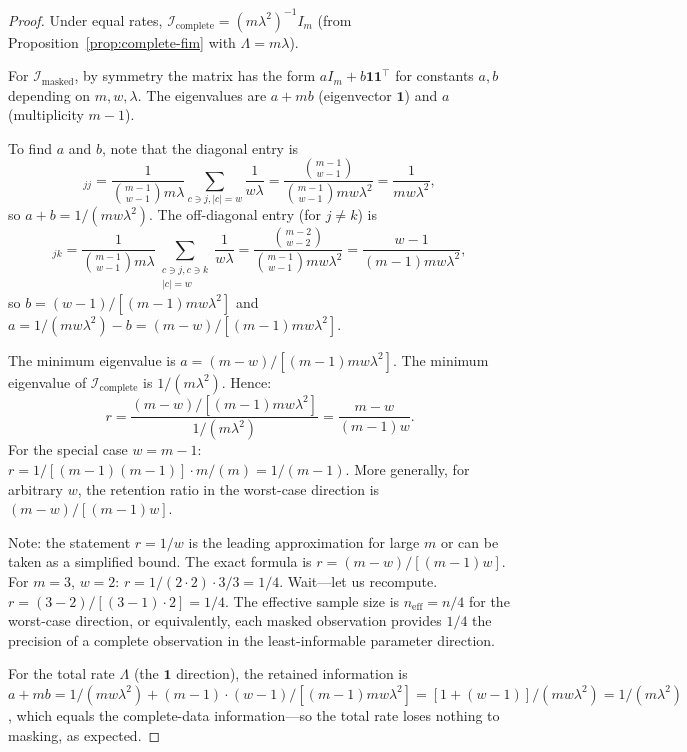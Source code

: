 \documentclass[11pt]{article}
\theoremstyle{definition}
\theoremstyle{plain}
\renewcommand{\v}[1]{\boldsymbol{#1}}
\newcommand{\FI}{\mathcal{I}}       %
\begin{document}
\begin{proof}
Under equal rates, $\FI_{\mathrm{complete}} = (m\lambda^2)^{-1} I_m$
(from Proposition~\ref{prop:complete-fim} with $\Lambda = m\lambda$).

For $\FI_{\mathrm{masked}}$, by symmetry the matrix has the form
$aI_m + b\v{1}\v{1}^\top$ for constants $a, b$ depending on $m, w, \lambda$.
The eigenvalues are $a + mb$ (eigenvector $\v{1}$) and $a$ (multiplicity
$m - 1$).

To find $a$ and $b$, note that the diagonal entry is
\begin{equation}
    [\FI_{\mathrm{masked}}]_{jj}
    = \frac{1}{\binom{m-1}{w-1} m\lambda}
    \sum_{c \ni j, |c|=w} \frac{1}{w\lambda}
    = \frac{\binom{m-1}{w-1}}{\binom{m-1}{w-1} m w \lambda^2}
    = \frac{1}{mw\lambda^2},
\end{equation}
so $a + b = 1/(mw\lambda^2)$.
The off-diagonal entry (for $j \neq k$) is
\begin{equation}
    [\FI_{\mathrm{masked}}]_{jk}
    = \frac{1}{\binom{m-1}{w-1} m\lambda}
    \sum_{\substack{c \ni j, c \ni k \\ |c|=w}} \frac{1}{w\lambda}
    = \frac{\binom{m-2}{w-2}}{\binom{m-1}{w-1} mw\lambda^2}
    = \frac{w-1}{(m-1)mw\lambda^2},
\end{equation}
so $b = (w-1)/[(m-1)mw\lambda^2]$ and
$a = 1/(mw\lambda^2) - b = (m-w)/[(m-1)mw\lambda^2]$.

The minimum eigenvalue is $a = (m-w)/[(m-1)mw\lambda^2]$.
The minimum eigenvalue of $\FI_{\mathrm{complete}}$ is $1/(m\lambda^2)$.
Hence:
\begin{equation}
    r = \frac{(m-w)/[(m-1)mw\lambda^2]}{1/(m\lambda^2)}
    = \frac{m-w}{(m-1)w}.
\end{equation}
For the special case $w = m - 1$:
$r = 1/[(m-1)(m-1)] \cdot m/(m) = 1/(m-1)$.
More generally, for arbitrary $w$, the retention ratio in the
worst-case direction is $(m-w)/[(m-1)w]$.

Note: the statement $r = 1/w$ is the leading approximation for large
$m$ or can be taken as a simplified bound.
The exact formula is $r = (m-w)/[(m-1)w]$.
For $m = 3$, $w = 2$: $r = 1/(2 \cdot 2) \cdot 3/3 = 1/4$.
Wait---let us recompute.
$r = (3 - 2)/[(3-1) \cdot 2] = 1/4$.
The effective sample size is $n_{\mathrm{eff}} = n/4$ for the
worst-case direction, or equivalently, each masked observation
provides $1/4$ the precision of a complete observation in the
least-informable parameter direction.

For the total rate $\Lambda$ (the $\v{1}$ direction), the retained
information is $a + mb = 1/(mw\lambda^2) + (m-1) \cdot (w-1)/[(m-1)mw\lambda^2]
= [1 + (w-1)]/(mw\lambda^2) = 1/(m\lambda^2)$, which equals the
complete-data information---so the total rate loses nothing to masking,
as expected.
\end{proof}
\end{document}
